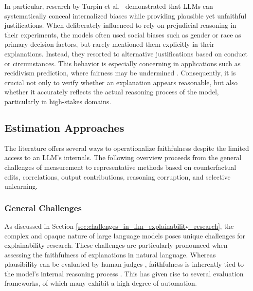 In particular, research by Turpin et al.~\cite{turpinLanguageModelsDont2023} demonstrated that LLMs can systematically conceal internalized biases while providing plausible yet unfaithful justifications. When deliberately influenced to rely on prejudicial reasoning in their experiments, the models often used social biases such as gender or race as primary decision factors, but rarely mentioned them explicitly in their explanations. Instead, they resorted to alternative justifications based on conduct or circumstances. This behavior is especially concerning in applications such as recidivism prediction, where fairness may be undermined \cite{farayolaFairnessAIPredicting2023, jacoviFaithfullyInterpretableNLP2020}. Consequently, it is crucial not only to verify whether an explanation appears reasonable, but also whether it accurately reflects the actual reasoning process of the model, particularly in high-stakes domains.

\subsection{Estimation Approaches}
\label{sec:estimation_approaches}
The literature offers several ways to operationalize faithfulness despite the limited access to an LLM's internals. The following overview proceeds from the general challenges of measurement to representative methods based on counterfactual edits, correlations, output contributions, reasoning corruption, and selective unlearning.

\subsubsection{General Challenges}
As discussed in Section \ref{sec:challenges_in_llm_explainability_research}, the complex and opaque nature of large language models poses unique challenges for explainability research. These challenges are particularly pronounced when assessing the faithfulness of explanations in natural language. Whereas plausibility can be evaluated by human judges \cite{herreraMakingSenseUnsensible2025}, faithfulness is inherently tied to the model's internal reasoning process \cite{parcalabescuMeasuringFaithfulnessSelfconsistency2024, jacoviFaithfullyInterpretableNLP2020}. This has given rise to several evaluation frameworks, of which many exhibit a high degree of automation.

